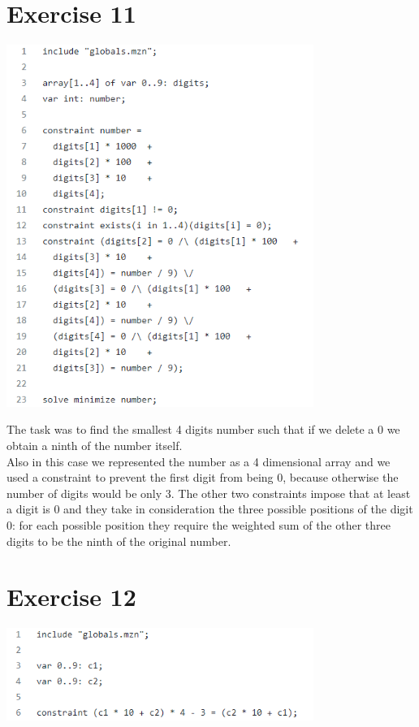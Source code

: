 \documentclass{article}
\begin{document}
\section{Exercise 11}
\vspace{0.2cm}
\includegraphics[width=10cm]{img/Es11.png}
\vspace{0.2cm}

The task was to find the smallest 4 digits number such that if we delete a 0 we obtain a ninth of the number itself. \\
Also in this case we represented the number as a 4 dimensional array and we used a constraint to prevent the first digit from being 0, because otherwise the number of digits would be only 3. The other two constraints impose that at least a digit is 0 and they take in consideration the three possible positions of the digit 0: for each possible position they require the weighted sum of the other three digits to be the ninth of the original number.

\section{Exercise 12}
\vspace{0.2cm}
\includegraphics[width=10cm]{img/Es12.png}
\vspace{0.2cm}
\end{document}
